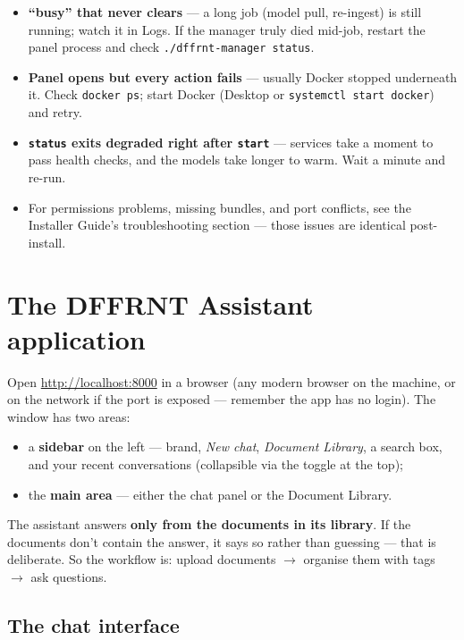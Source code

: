 \documentclass[11pt,letterpaper]{article}
\let\oldsection\section
\renewcommand{\section}{\vspace{1em}\oldsection}
\begin{document}
\begin{itemize}
  \item \textbf{``busy'' that never clears} --- a long job (model pull,
        re-ingest) is still running; watch it in Logs. If the manager truly
        died mid-job, restart the panel process and check
        \texttt{./dffrnt-manager status}.
  \item \textbf{Panel opens but every action fails} --- usually Docker
        stopped underneath it. Check \texttt{docker ps}; start Docker
        (Desktop or \texttt{systemctl start docker}) and retry.
  \item \textbf{\texttt{status} exits degraded right after \texttt{start}}
        --- services take a moment to pass health checks, and the models take
        longer to warm. Wait a minute and re-run.
  \item For permissions problems, missing bundles, and port conflicts, see
        the Installer Guide's troubleshooting section --- those issues are
        identical post-install.
\end{itemize}

\section{The DFFRNT Assistant application}

Open \url{http://localhost:8000} in a browser (any modern browser on the
machine, or on the network if the port is exposed --- remember the app has no
login). The window has two areas:

\begin{itemize}
  \item a \textbf{sidebar} on the left --- brand, \emph{New chat},
        \emph{Document Library}, a search box, and your recent conversations
        (collapsible via the toggle at the top);
  \item the \textbf{main area} --- either the chat panel or the Document
        Library.
\end{itemize}

The assistant answers \textbf{only from the documents in its library}. If the
documents don't contain the answer, it says so rather than guessing --- that
is deliberate. So the workflow is: upload documents $\rightarrow$ organise
them with tags $\rightarrow$ ask questions.

\subsection{The chat interface}
\end{document}
